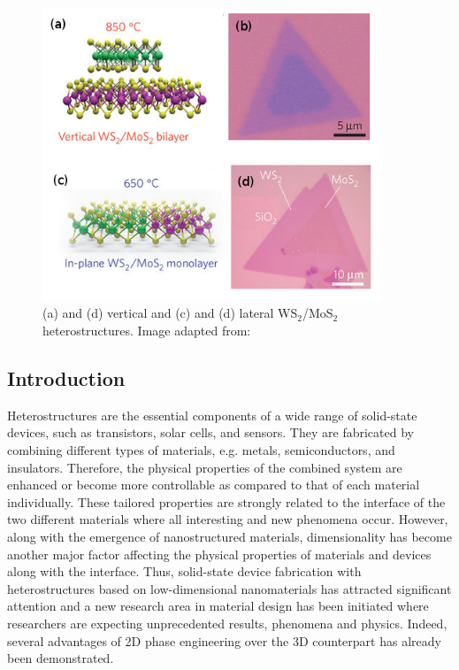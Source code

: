 \begin{figure}[htb]
\centering
\includegraphics[width=0.9\textwidth]{ver-lat-stru.png}
\caption{ (a) and (d) vertical and (c) and (d) lateral WS$_2$/MoS$_2$ heterostructures. \label{fig:ver-lat-stru} Image adapted from: \cite{Gong_Lin2014}}
\end{figure}

\subsection{Introduction}
Heterostructures are the essential components of a wide range of solid-state devices, such as transistors, solar cells, and sensors\cite{singh1993,agostini2011}. They are  fabricated by combining different types of materials, e.g. metals, semiconductors, and insulators. Therefore, the physical properties of the combined system are enhanced or become more controllable as compared to that of each material individually. These tailored properties are strongly related to the interface of the two different materials where all interesting and new phenomena occur. However, along with the emergence of nanostructured materials, dimensionality has become another major factor affecting the physical properties of materials and devices along with the interface. Thus, solid-state device fabrication with heterostructures based on low-dimensional nanomaterials has attracted significant attention and a new research area in material design has been initiated where researchers are expecting unprecedented results, phenomena and physics\cite{Gan2013,Wu2015c,DiBartolomeo2016}. Indeed, several advantages of 2D phase engineering over the 3D counterpart has already been demonstrated.\cite{Duerloo2015}

